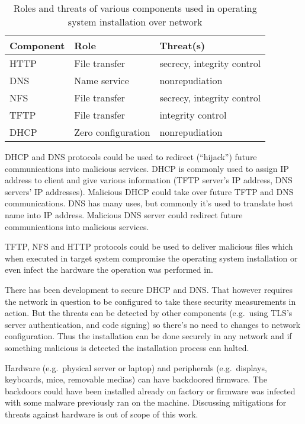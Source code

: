 \begin{table}[!ht]
  \def\arraystretch{1.1}%
  \begin{center}
    \label{tab:threats_table}
    \begin{tabular}{| l | l | l |}
      \hline
      Component   & Role               & Threat(s)                  \\
      \hline
      HTTP        & File transfer      & secrecy, integrity control \\
      DNS         & Name service       & nonrepudiation             \\
      NFS         & File transfer      & secrecy, integrity control \\
      TFTP        & File transfer      & integrity control          \\
      DHCP        & Zero configuration & nonrepudiation             \\
      \hline
    \end{tabular}
    \caption{Roles and threats of various components used in operating
      system installation over network}
  \end{center}
\end{table}

DHCP and DNS protocols could be used to redirect (``hijack'') future
communications into malicious services. DHCP is commonly used to
assign IP address to client and give various information (TFTP
server's IP address, DNS servers' IP addresses). Malicious DHCP could
take over future TFTP and DNS communications. DNS has many uses, but
commonly it's used to translate host name into IP address. Malicious
DNS server could redirect future communications into malicious
services.

TFTP, NFS and HTTP protocols could be used to deliver malicious files
which when executed in target system compromise the operating system
installation or even infect the hardware the operation was performed
in.

There has been development to secure DHCP and DNS\@. That however
requires the network in question to be configured to take these
security measurements in action. But the threats can be detected by
other components (e.g.\ using TLS's server authentication, and code
signing) so there's no need to changes to network configuration. Thus
the installation can be done securely in any network and if something
malicious is detected the installation process can halted.

Hardware (e.g.\ physical server or laptop) and peripherals
(e.g.\ displays, keyboards, mice, removable medias) can have backdoored
firmware. The backdoors could have been installed already on factory
or firmware was infected with some malware previously ran on the
machine. Discussing mitigations for threats against hardware is out of
scope of this work.


